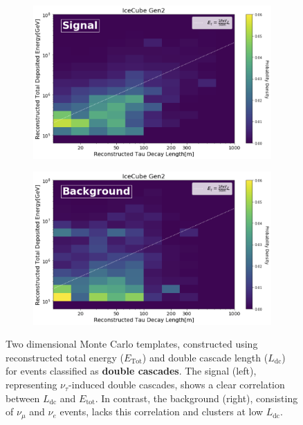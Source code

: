 \begin{figure}[h]
    \begin{subfigure}[h]{0.7\textwidth}
        \includegraphics{./figures/gen2/Signal_PDF.png}
    \end{subfigure}
    \hfill
    \begin{subfigure}[h]{0.7\textwidth}
        \includegraphics{./figures/gen2/Bkg_PDF.png}
       
    \end{subfigure}
    \caption[2D Monte Carlo PDFs of reconstruct energy and length for double cascade events in IceCube-Gen2]{Two dimensional Monte Carlo templates, constructed using reconstructed total energy ($E_{\text{Tot}}$) and double cascade length ($L_{\text{dc}}$) for events classified as \textbf{double cascades}. The signal (left), representing $\nu_\tau$-induced double cascades, shows a clear correlation between $L_{\text{dc}}$ and $E_{\text{tot}}$. In contrast, the background (right), consisting of $\nu_\mu$ and $\nu_e$ events, lacks this correlation and clusters at low $L_{\text{dc}}$.}
    
\end{figure}



